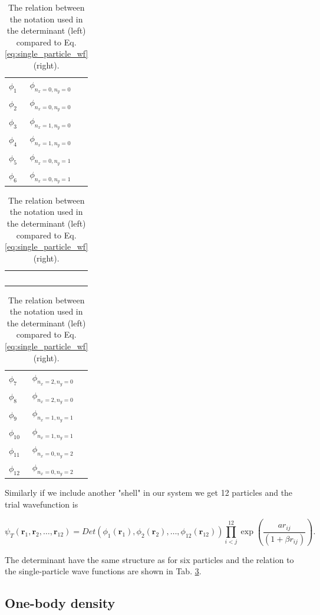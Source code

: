 \begin{table}[H]\caption{The relation between the notation used in the determinant (left) compared to Eq. \ref{eq:single_particle_wf} (right). }\label{tab:notation_wavefunctions}
\large
\center
\begin{tabular}{l|l} 
$\phi_{1}$ & $\phi_{n_x=0, n_y=0}$\\
$\phi_{2}$ & $\phi_{n_x=0, n_y=0}$\\
$\phi_{3}$ & $\phi_{n_x=1, n_y=0}$\\
$\phi_{4}$ & $\phi_{n_x=1, n_y=0}$\\
$\phi_{5}$ & $\phi_{n_x=0, n_y=1}$\\
$\phi_{6}$ & $\phi_{n_x=0, n_y=1}$\\
\end{tabular}
\begin{tabular}{c}
$\,$
\end{tabular}
\begin{tabular}{l|l} 
$\phi_{7}$ & $\phi_{n_x=2, n_y=0}$\\
$\phi_{8}$ & $\phi_{n_x=2, n_y=0}$\\
$\phi_{9}$ & $\phi_{n_x=1, n_y=1}$\\
$\phi_{10}$ & $\phi_{n_x=1, n_y=1}$\\
$\phi_{11}$ & $\phi_{n_x=0, n_y=2}$\\
$\phi_{12}$ & $\phi_{n_x=0, n_y=2}$\\
\end{tabular}
\end{table}

Similarly if we include another "shell" in our system we get 12 particles and the trial wavefunction is 

\begin{equation}
   \psi_{T}(\bm{r}_1,\bm{r}_2, \dots,\bm{r}_{12}) = 
   Det\left(\phi_{1}(\bm{r}_1),\phi_{2}(\bm{r}_2),
   \dots,\phi_{12}(\bm{r}_{12})\right)
   \prod_{i<j}^{12}\exp{\left(\frac{ar_{ij}}{(1+\beta r_{ij})}\right)}.
\end{equation}

The determinant have the same structure as for six particles and the relation to the single-particle wave functions are shown in Tab. \ref{tab:notation_wavefunctions}.

\subsection{One-body density}

